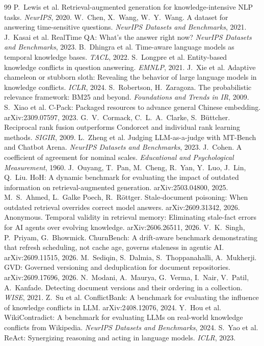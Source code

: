 \documentclass[11pt,a4paper]{article}
\begin{document}
\begin{thebibliography}{99}\small
{} P.~Lewis et al. Retrieval-augmented generation for knowledge-intensive NLP tasks. \emph{NeurIPS}, 2020.
 W.~Chen, X.~Wang, W.~Y.~Wang. A dataset for answering time-sensitive questions. \emph{NeurIPS Datasets and Benchmarks}, 2021.
 J.~Kasai et al. RealTime QA: What's the answer right now? \emph{NeurIPS Datasets and Benchmarks}, 2023.
 B.~Dhingra et al. Time-aware language models as temporal knowledge bases. \emph{TACL}, 2022.
 S.~Longpre et al. Entity-based knowledge conflicts in question answering. \emph{EMNLP}, 2021.
 J.~Xie et al. Adaptive chameleon or stubborn sloth: Revealing the behavior of large language models in knowledge conflicts. \emph{ICLR}, 2024.
 S.~Robertson, H.~Zaragoza. The probabilistic relevance framework: BM25 and beyond. \emph{Foundations and Trends in IR}, 2009.
 S.~Xiao et al. C-Pack: Packaged resources to advance general Chinese embedding. arXiv:2309.07597, 2023.
 G.~V.~Cormack, C.~L.~A.~Clarke, S.~B\"uttcher. Reciprocal rank fusion outperforms Condorcet and individual rank learning methods. \emph{SIGIR}, 2009.
 L.~Zheng et al. Judging LLM-as-a-judge with MT-Bench and Chatbot Arena. \emph{NeurIPS Datasets and Benchmarks}, 2023.
 J.~Cohen. A coefficient of agreement for nominal scales. \emph{Educational and Psychological Measurement}, 1960.
 J.~Ouyang, T.~Pan, M.~Cheng, R.~Yan, Y.~Luo, J.~Lin, Q.~Liu. HoH: A dynamic benchmark for evaluating the impact of outdated information on retrieval-augmented generation. arXiv:2503.04800, 2025.
 M.~S.~Ahmed, L.~Galke Poech, R.~R\"ottger. Stale-document poisoning: When outdated retrieval overrides correct model answers. arXiv:2609.31342, 2026.
 Anonymous. Temporal validity in retrieval memory: Eliminating stale-fact errors for AI agents over evolving knowledge. arXiv:2606.26511, 2026.
 V.~K.~Singh, P.~Priyam, G.~Bhowmick. ChurnBench: A drift-aware benchmark demonstrating that refresh scheduling, not cache age, governs staleness in agentic AI. arXiv:2609.11515, 2026.
 M.~Sediqin, S.~Dalmia, S.~Thoppanahalli, A.~Mukherji. GVD: Governed versioning and deduplication for document repositories. arXiv:2609.17696, 2026.
 N.~Modani, A.~Maurya, G.~Verma, I.~Nair, V.~Patil, A.~Kanfade. Detecting document versions and their ordering in a collection. \emph{WISE}, 2021.
 Z.~Su et al. ConflictBank: A benchmark for evaluating the influence of knowledge conflicts in LLM. arXiv:2408.12076, 2024.
 Y.~Hou et al. WikiContradict: A benchmark for evaluating LLMs on real-world knowledge conflicts from Wikipedia. \emph{NeurIPS Datasets and Benchmarks}, 2024.
 S.~Yao et al. ReAct: Synergizing reasoning and acting in language models. \emph{ICLR}, 2023.
\end{thebibliography}
\end{document}
